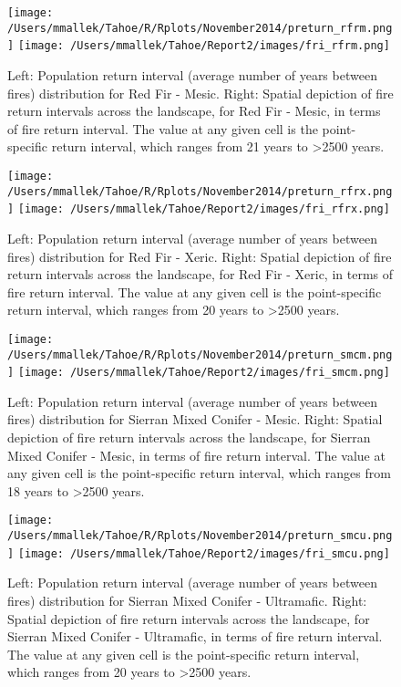 \begin{figure}[p]
\texttt{[image: /Users/mmallek/Tahoe/R/Rplots/November2014/preturn\_rfrm.png]}
\texttt{[image: /Users/mmallek/Tahoe/Report2/images/fri\_rfrm.png]}
\caption{Left: Population return interval (average number of years between fires) distribution for Red Fir - Mesic.  Right: Spatial depiction of fire return intervals across the landscape, for Red Fir - Mesic, in terms of fire return interval. The value at any given cell is the point-specific return interval, which ranges from 21 years to \textgreater 2500 years.}
\label{preturn_rfrm}
\end{figure}

\begin{figure}[p]
\texttt{[image: /Users/mmallek/Tahoe/R/Rplots/November2014/preturn\_rfrx.png]}
\texttt{[image: /Users/mmallek/Tahoe/Report2/images/fri\_rfrx.png]}
\caption{Left: Population return interval (average number of years between fires) distribution for Red Fir - Xeric.  Right: Spatial depiction of fire return intervals across the landscape, for Red Fir - Xeric, in terms of fire return interval. The value at any given cell is the point-specific return interval, which ranges from 20 years to \textgreater 2500 years.}
\label{preturn_rfrx}
\end{figure}

\begin{figure}[p]
\texttt{[image: /Users/mmallek/Tahoe/R/Rplots/November2014/preturn\_smcm.png]}
\texttt{[image: /Users/mmallek/Tahoe/Report2/images/fri\_smcm.png]}
\caption{Left: Population return interval (average number of years between fires) distribution for Sierran Mixed Conifer - Mesic.  Right: Spatial depiction of fire return intervals across the landscape, for Sierran Mixed Conifer - Mesic, in terms of fire return interval. The value at any given cell is the point-specific return interval, which ranges from 18 years to \textgreater 2500 years.}
\label{preturn_smcm}
\end{figure}

\begin{figure}[p]
\texttt{[image: /Users/mmallek/Tahoe/R/Rplots/November2014/preturn\_smcu.png]}
\texttt{[image: /Users/mmallek/Tahoe/Report2/images/fri\_smcu.png]}
\caption{Left: Population return interval (average number of years between fires) distribution for Sierran Mixed Conifer - Ultramafic.  Right: Spatial depiction of fire return intervals across the landscape, for Sierran Mixed Conifer - Ultramafic, in terms of fire return interval. The value at any given cell is the point-specific return interval, which ranges from 20 years to \textgreater 2500 years.}
\label{preturn_smcu}
\end{figure}

